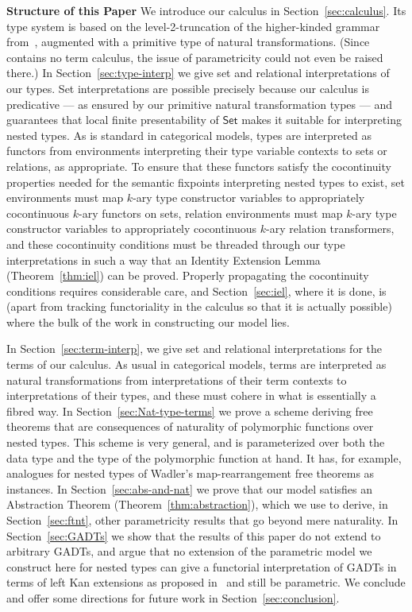 \documentclass{lmcs}
\theoremstyle{plain}\newtheorem{satz}[thm]{Satz}
\newcommand{\set}{\mathsf{Set}}
\begin{document}
\noindent
{\bf Structure of this Paper}\/ We introduce our calculus in
Section~\ref{sec:calculus}.  Its type system is based on the
level-2-truncation of the higher-kinded grammar from~\cite{jp19},
augmented with a primitive type of natural
transformations. (Since~\cite{jp19} contains no term calculus, the
issue of parametricity could not even be raised there.)  In
Section~\ref{sec:type-interp} we give set and relational
interpretations of our types. Set interpretations are possible
precisely because our calculus is predicative --- as ensured by our
primitive natural transformation types --- and~\cite{jp19} guarantees
that local finite presentability of $\set$ makes it suitable for
interpreting nested types.  As is standard in categorical models,
types are interpreted as functors from environments interpreting their
type variable contexts to sets or relations, as appropriate. To ensure
that these functors satisfy the cocontinuity properties needed for the
semantic fixpoints interpreting nested types to exist, set environments
must map $k$-ary type constructor variables to appropriately
cocontinuous $k$-ary functors on sets, relation environments must map
$k$-ary type constructor variables to appropriately cocontinuous
$k$-ary relation transformers, and these cocontinuity conditions must
be threaded through our type interpretations in such a way that an
Identity Extension Lemma (Theorem~\ref{thm:iel}) can be
proved. Properly propagating the cocontinuity conditions requires
considerable care, and Section~\ref{sec:iel}, where it is done, is
(apart from tracking functoriality in the calculus so that it is
actually possible) where the bulk of the work in constructing our
model lies.

In Section~\ref{sec:term-interp}, we give set and relational
interpretations for the terms of our calculus. As usual in categorical
models, terms are interpreted as natural transformations from
interpretations of their term contexts to interpretations of their
types, and these must cohere in what is essentially a fibred way.  In
Section~\ref{sec:Nat-type-terms} we prove a scheme deriving free
theorems that are consequences of naturality of polymorphic functions
over nested types. This scheme is very general, and is parameterized
over both the data type and the type of the polymorphic function at
hand. It has, for example, analogues for nested types of Wadler's
map-rearrangement free theorems as instances. In
Section~\ref{sec:abs-and-nat} we prove that our model satisfies an
Abstraction Theorem (Theorem~\ref{thm:abstraction}), which we use to
derive, in Section~\ref{sec:ftnt}, other parametricity results that go
beyond mere naturality. In Section~\ref{sec:GADTs} we show that the
results of this paper do not extend to arbitrary GADTs, and argue that
no extension of the parametric model we construct here for nested
types can give a functorial interpretation of GADTs in terms of left
Kan extensions as proposed in~\cite{jp19} and still be parametric. We
conclude and offer some directions for future work in
Section~\ref{sec:conclusion}.
\end{document}
